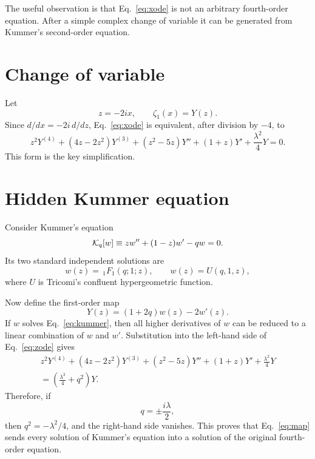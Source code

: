 \documentclass[%
 aip,
 jmp,%
 amsmath,amssymb,
 reprint,%
]{revtex4-2}
\begin{document}
The useful observation is that Eq.~\eqref{eq:xode} is not an arbitrary
fourth-order equation.  After a simple complex change of variable it can be
generated from Kummer's second-order equation.

\section{Change of variable}

Let
\begin{equation}
\label{eq:zdef}
z=-2ix,\qquad \zeta_1(x)=Y(z).
\end{equation}
Since $d/dx=-2i\,d/dz$, Eq.~\eqref{eq:xode} is equivalent, after division by
$-4$, to
\begin{equation}
\label{eq:zode}
z^2Y^{(4)}
+ (4z-2z^2)Y^{(3)}
+ (z^2-5z)Y''
+ (1+z)Y'
+ \frac{\lambda^2}{4}Y=0.
\end{equation}
This form is the key simplification.

\section{Hidden Kummer equation}

Consider Kummer's equation
\begin{equation}
\label{eq:kummer}
\mathcal{K}_q[w]\equiv z w''+(1-z)w'-q w=0.
\end{equation}
Its two standard independent solutions are
\begin{equation}
w(z)=\,_1F_1(q;1;z),
\qquad
w(z)=U(q,1,z),
\end{equation}
where $U$ is Tricomi's confluent hypergeometric function.

Now define the first-order map
\begin{equation}
\label{eq:map}
Y(z)=(1+2q)w(z)-2w'(z).
\end{equation}
If $w$ solves Eq.~\eqref{eq:kummer}, then all higher derivatives of $w$ can be
reduced to a linear combination of $w$ and $w'$.  Substitution into the
left-hand side of Eq.~\eqref{eq:zode} gives
\begin{equation}
\begin{multlined}
z^2Y^{(4)}
+(4z-2z^2)Y^{(3)}
+(z^2-5z)Y''
+(1+z)Y'
+\frac{\lambda^2}{4}Y \\
=
\left(\frac{\lambda^2}{4}+q^2\right)Y.
\end{multlined}
\end{equation}
Therefore, if
\begin{equation}
\label{eq:qvalues}
q=\pm \frac{i\lambda}{2},
\end{equation}
then $q^2=-\lambda^2/4$, and the right-hand side vanishes.  This proves that
Eq.~\eqref{eq:map} sends every solution of Kummer's equation into a solution
of the original fourth-order equation.
\end{document}
